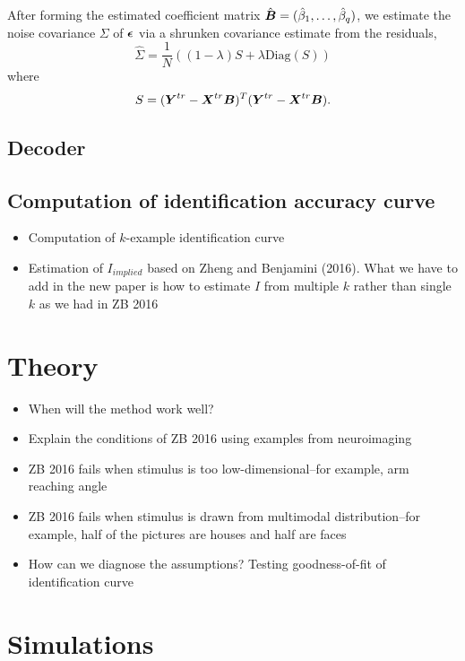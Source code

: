 \documentclass[12pt]{article}
\begin{document}
After forming the estimated coefficient matrix $\hat{\boldsymbol{B}} =
(\hat{\beta}_1,\hdots, \hat{\beta}_q)$, we estimate the noise
covariance $\Sigma$ of $\boldsymbol{\epsilon}$ via a shrunken covariance
estimate\cite{Ledoit2004}\cite{Daniels2001} from the residuals,
\[
\hat{\Sigma} = \frac{1}{N} ((1-\lambda) S + \lambda \text{Diag}(S)) 
\]
where
\[
S = (\boldsymbol{Y}^{tr} - \boldsymbol{X}^{tr} \boldsymbol{B})^T (\boldsymbol{Y}^{tr} - \boldsymbol{X}^{tr} \boldsymbol{B}).
\]

\subsection{Decoder}



\subsection{Computation of identification accuracy curve}






\begin{itemize}
\item Computation of $k$-example identification curve
\item Estimation of $I_{implied}$ based on Zheng and Benjamini (2016). What we have to add in the new paper is how to estimate $I$ from multiple $k$ rather than single $k$ as we had in ZB 2016
\end{itemize}

\section{Theory}

\begin{itemize}
\item When will the method work well?
\item Explain the conditions of ZB 2016 using examples from neuroimaging
\item ZB 2016 fails when stimulus is too low-dimensional--for example, arm reaching angle
\item ZB 2016 fails when stimulus is drawn from multimodal distribution--for example, half of the pictures are houses and half are faces
\item How can we diagnose the assumptions? Testing goodness-of-fit of identification curve
\end{itemize}

\section{Simulations}
\end{document}
